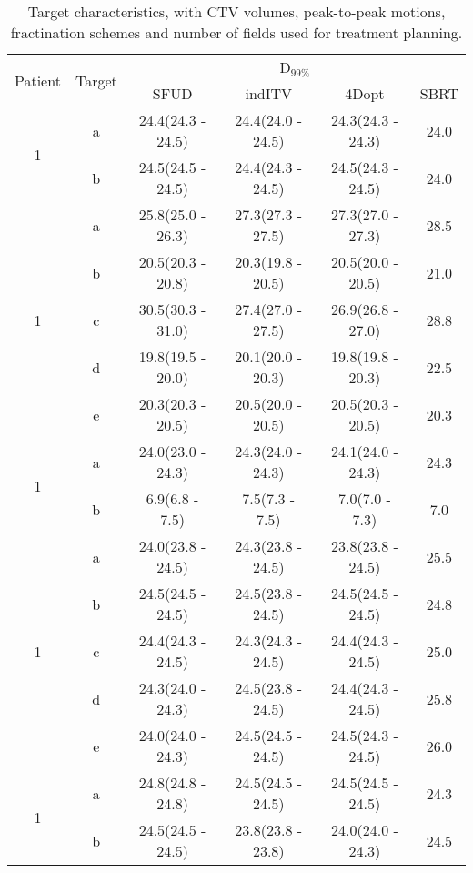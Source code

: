 \documentclass[type=dr, dr=rernat, accentcolor=tud7b,colorbacktitle, bigchapter, openright, twoside, 12pt ]{tudthesis}
\begin{document}
\begin{table}[H]
	\centering
	\caption{Target characteristics, with CTV volumes, peak-to-peak motions, fractination schemes and number of fields used for treatment planning.}
	\begin{tabular}{c|c|c|c|c|c}
		\hline\hline
		\multirow{2}{*}{Patient} & \multirow{2}{*}{Target} & \multicolumn{4}{|c}{D$_{99\%}$} \\
		 & & SFUD & indITV & 4Dopt & SBRT \\
		\hline

\multirow{2}{*}{1} & a & 24.4(24.3 - 24.5) & 24.4(24.0 - 24.5) & 24.3(24.3 - 24.3) & 24.0\\ 
 & b & 24.5(24.5 - 24.5) & 24.4(24.3 - 24.5) & 24.5(24.3 - 24.5) & 24.0\\ 
\hline

\multirow{5}{*}{1} & a & 25.8(25.0 - 26.3) & 27.3(27.3 - 27.5) & 27.3(27.0 - 27.3) & 28.5\\ 
 & b & 20.5(20.3 - 20.8) & 20.3(19.8 - 20.5) & 20.5(20.0 - 20.5) & 21.0\\ 
 & c & 30.5(30.3 - 31.0) & 27.4(27.0 - 27.5) & 26.9(26.8 - 27.0) & 28.8\\ 
 & d & 19.8(19.5 - 20.0) & 20.1(20.0 - 20.3) & 19.8(19.8 - 20.3) & 22.5\\ 
 & e & 20.3(20.3 - 20.5) & 20.5(20.0 - 20.5) & 20.5(20.3 - 20.5) & 20.3\\ 
\hline

\multirow{2}{*}{1} & a & 24.0(23.0 - 24.3) & 24.3(24.0 - 24.3) & 24.1(24.0 - 24.3) & 24.3\\ 
 & b & 6.9(6.8 - 7.5) & 7.5(7.3 - 7.5) & 7.0(7.0 - 7.3) & 7.0\\ 
\hline

\multirow{5}{*}{1} & a & 24.0(23.8 - 24.5) & 24.3(23.8 - 24.5) & 23.8(23.8 - 24.5) & 25.5\\ 
 & b & 24.5(24.5 - 24.5) & 24.5(23.8 - 24.5) & 24.5(24.5 - 24.5) & 24.8\\ 
 & c & 24.4(24.3 - 24.5) & 24.3(24.3 - 24.5) & 24.4(24.3 - 24.5) & 25.0\\ 
 & d & 24.3(24.0 - 24.3) & 24.5(23.8 - 24.5) & 24.4(24.3 - 24.5) & 25.8\\ 
 & e & 24.0(24.0 - 24.3) & 24.5(24.5 - 24.5) & 24.5(24.3 - 24.5) & 26.0\\ 
\hline

\multirow{2}{*}{1} & a & 24.8(24.8 - 24.8) & 24.5(24.5 - 24.5) & 24.5(24.5 - 24.5) & 24.3\\ 
 & b & 24.5(24.5 - 24.5) & 23.8(23.8 - 23.8) & 24.0(24.0 - 24.3) & 24.5\\ 
\hline


\end{tabular}
\end{table}
\end{document}
